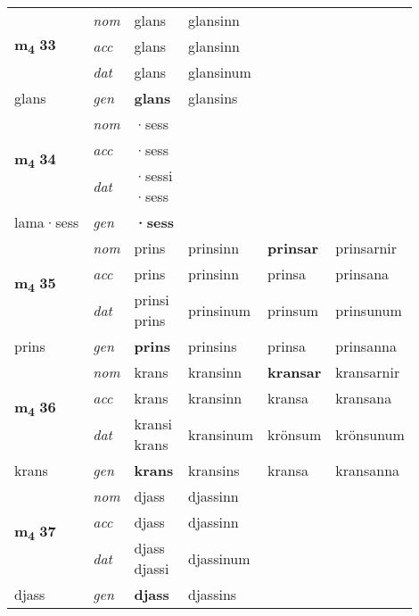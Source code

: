 \begin{longtable}[l]{X>{\footnotesize\itshape}XXXXX}
\multirow{3}{*}{{{\textbf{m{\textsubscript{4}}} \Large{\textbf{33}}}}} & nom & glans & glansinn & \textbf{} &  \\*
 & acc & glans & glansinn &  &  \\*
 & dat & glans & glansinum &  &  \\*
 {\footnotesize{glans}} & gen & \textbf{glans} & glansins &  &  \\
\cmidrule{1-6}

\multirow{3}{*}{{{\textbf{m{\textsubscript{4}}} \Large{\textbf{34}}}}} & nom & ·sess &  & \textbf{} &  \\*
 & acc & ·sess &  &  &  \\*
 & dat & \specialcell{·sessi\\  ·sess} &  &  &  \\*
 {\footnotesize{lama\allowbreak ·sess}} & gen & \textbf{·sess} &  &  &  \\
\cmidrule{1-6}

\multirow{3}{*}{{{\textbf{m{\textsubscript{4}}} \Large{\textbf{35}}}}} & nom & prins & prinsinn & \textbf{prinsar} & prinsarnir \\*
 & acc & prins & prinsinn & prinsa & prinsana \\*
 & dat & \specialcell{prinsi\\ prins} & prinsinum & prinsum & prinsunum \\*
 {\footnotesize{prins}} & gen & \textbf{prins} & prinsins & prinsa & prinsanna \\
\cmidrule{1-6}

\multirow{3}{*}{{{\textbf{m{\textsubscript{4}}} \Large{\textbf{36}}}}} & nom & krans & kransinn & \textbf{kransar} & kransarnir \\*
 & acc & krans & kransinn & kransa & kransana \\*
 & dat & \specialcell{kransi\\ krans} & kransinum & krönsum & krönsunum \\*
 {\footnotesize{krans}} & gen & \textbf{krans} & kransins & kransa & kransanna \\
\cmidrule{1-6}

\multirow{3}{*}{{{\textbf{m{\textsubscript{4}}} \Large{\textbf{37}}}}} & nom & djass & djassinn & \textbf{} &  \\*
 & acc & djass & djassinn &  &  \\*
 & dat & \specialcell{djass\\ djassi} & djassinum &  &  \\*
 {\footnotesize{djass}} & gen & \textbf{djass} & djassins &  &  \\
\cmidrule{1-6}


\end{longtable}
